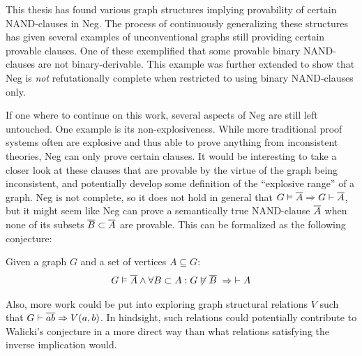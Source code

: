 This thesis has found various graph structures implying provability of certain NAND-clauses in Neg.
The process of continuously generalizing these structures has given several examples of unconventional graphs still providing certain provable clauses.
One of these exemplified that some provable binary NAND-clauses are not binary-derivable.
This example was further extended to show that Neg is \textit{not} refutationally complete when restricted to using binary NAND-clauses only.

If one where to continue on this work, several aspects of Neg are still left untouched.
One example is its non-explosiveness.
While more traditional proof systems often are explosive and thus able to prove anything from inconsistent theories, Neg can only prove certain clauses.
It would be interesting to take a closer look at these clauses that are provable by the virtue of the graph being inconsistent, and potentially develop some definition of the ``explosive range'' of a graph.
Neg is not complete, so it does not hold in general that $G \vDash \ol{A} \Rightarrow G \vdash \ol{A}$, but it might seem like Neg can prove a semantically true NAND-clause $\ol{A}$ when none of its subsets $\ol{B} \subset \ol{A}$ are provable.
This can be formalized as the following conjecture:
\begin{conjecture}
  Given a graph $G$ and a set of vertices $A \subseteq G$:
  \begin{align}
    G \vDash \ol{A} \wedge \forall B \subset A: G \not\vDash \ol{ B } \;\Rightarrow \; \vdash A
  \end{align}
\end{conjecture}

Also, more work could be put into exploring graph structural relations $V$ such that $G \vdash \ol{ab} \Rightarrow V(a,b)$.
In hindsight, such relations could potentially contribute to Walicki's conjecture in a more direct way than what relations satisfying the inverse implication would.
